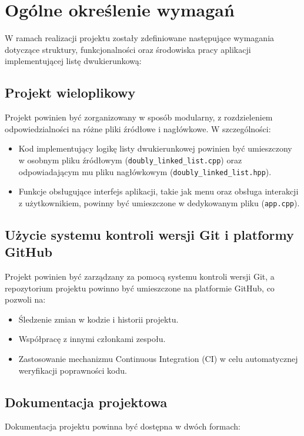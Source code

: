 \newpage
\section{Ogólne określenie wymagań}		%

\hspace{0.60cm}
W ramach realizacji projektu zostały zdefiniowane następujące wymagania dotyczące struktury, funkcjonalności oraz środowiska pracy aplikacji implementującej listę dwukierunkową:

\subsection{Projekt wieloplikowy}
Projekt powinien być zorganizowany w sposób modularny, z rozdzieleniem odpowiedzialności na różne pliki źródłowe i nagłówkowe. W szczególności:

\begin{itemize}
	\item Kod implementujący logikę listy dwukierunkowej powinien być umieszczony \\ w osobnym pliku źródłowym (\texttt{doubly\_linked\_list.cpp}) oraz odpowiadającym mu pliku nagłówkowym (\texttt{doubly\_linked\_list.hpp}).
	\item Funkcje obsługujące interfejs aplikacji, takie jak menu oraz obsługa interakcji z użytkownikiem, powinny być umieszczone w dedykowanym pliku (\texttt{app.cpp}).
\end{itemize}

\subsection{Użycie systemu kontroli wersji Git i platformy GitHub}
Projekt powinien być zarządzany za pomocą systemu kontroli wersji Git, a repozytorium projektu powinno być umieszczone na platformie GitHub, co pozwoli na:

\begin{itemize}
	\item Śledzenie zmian w kodzie i historii projektu.
	\item Współpracę z innymi członkami zespołu.
	\item Zastosowanie mechanizmu Continuous Integration (CI) w celu automatycznej weryfikacji poprawności kodu.
\end{itemize}

\subsection{Dokumentacja projektowa}
Dokumentacja projektu powinna być dostępna w dwóch formach:

